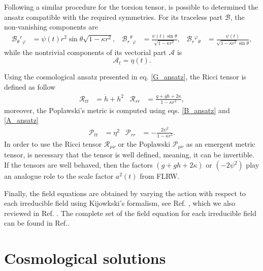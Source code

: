 \documentclass{article}
\providecommand{\B}[3]{\mathcal{B}_{#1}{}^{ #2}{}_{#3}}
\providecommand{\A}[1]{\mathcal{A}_{#1}}
\begin{document}
Following a similar procedure for the torsion tensor, is possible to determined the ansatz compatible with 
the required symmetries. For its traceless part $\mathcal{B}$, the non-vanishing components are
\begin{equation}
\label{B_ansatz}
\begin{aligned}
    \B{\theta}{r}{\varphi} & = \psi (t) r^2\sin\theta \sqrt{1 - \kappa r^2}, &
    \B{r}{\theta}{\varphi} & =\frac{\psi (t) \sin \theta}{\sqrt{1 - \kappa r^2}}, & 
    \B{r}{\varphi}{\theta} & =\frac{\psi(t)}{ \sqrt{1-\kappa r^{2}} \sin \theta},
\end{aligned}
\end{equation}
while the nontrivial components of its vectorial part $\mathcal{A}$ is
\begin{equation}
    \label{A_ansatz}
    \A{t} = \eta(t).
\end{equation}

Using the cosmological ansatz presented in eq. \eqref{G_ansatz}, the Ricci tensor is 
defined as follow
\begin{align}
    \label{Ricci_tensor}
    \mathcal{R}_{tt} & = \dot{h} + h^2 & \mathcal{R}_{rr} & = \frac{\dot{g} + gh + 2\kappa}{1 - \kappa r^2},
\end{align}
moreover, the Poplawski's metric is computed using eqs. \eqref{B_ansatz} and \eqref{A_ansatz}
\begin{align}
    \label{Pop_tensor}
    \mathcal{P}_{tt} & = \eta^2 & \mathcal{P}_{rr} & = -\frac{2\psi^2}{1 - \kappa r^2}.
\end{align}
In order to use the Ricci tensor $\mathcal{R}_{\mu\nu}$ or the Poplawski $\mathcal{P}_{\mu\nu}$ as an
emergent metric tensor, is necessary that the tensor is well defined, meaning, it can be invertible. If the
tensors are well behaved, then the factors $\left(\dot{g} + gh + 2\kappa\right)$ or $\left(-2\psi^2\right)$ play an analogue role to 
the scale factor $a^2(t)$ from FLRW.

Finally, the field equations are obtained by varying the action with respect to each irreducible field using Kijowkski's 
formalism, see Ref. \cite{KJ_Formalism}, which we also reviewed in Ref. \cite{Castillo_Felisola_2020}. The complete 
set of the field equation for each irreducible field can be found in Ref.\cite{Castillo-Felisola_2023}.
\section{Cosmological solutions}
\label{sec:solutions}
\end{document}
